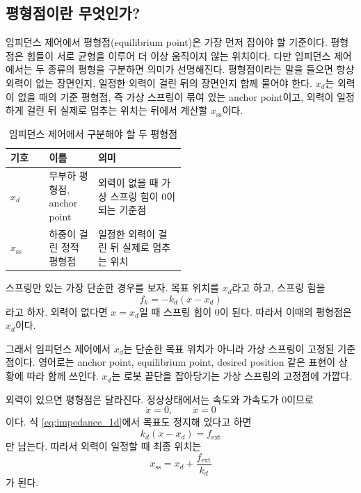 \subsection{평형점이란 무엇인가?}

임피던스 제어에서 평형점(equilibrium point)은 가장 먼저 잡아야 할 기준이다.
평형점은 힘들이 서로 균형을 이루어 더 이상 움직이지 않는 위치이다.
다만 임피던스 제어에서는 두 종류의 평형을 구분하면 의미가 선명해진다.
평형점이라는 말을 들으면 항상 외력이 없는 장면인지, 일정한 외력이 걸린 뒤의 장면인지 함께 물어야 한다.
$x_d$는 외력이 없을 때의 기준 평형점, 즉 가상 스프링이 묶여 있는 anchor point이고, 외력이 일정하게 걸린 뒤 실제로 멈추는 위치는 뒤에서 계산할 $x_{\mathrm{ss}}$이다.

\begin{table}[!htbp]
  \centering
  \caption{임피던스 제어에서 구분해야 할 두 평형점}
  \small
  \begin{tabularx}{\linewidth}{@{}>{\raggedright\arraybackslash}p{0.22\linewidth}>{\raggedright\arraybackslash}p{0.28\linewidth}>{\raggedright\arraybackslash}X@{}}
    \toprule
    기호 & 이름 & 의미 \\
    \midrule
    $x_d$ & 무부하 평형점, anchor point & 외력이 없을 때 가상 스프링 힘이 0이 되는 기준점 \\
    $x_{\mathrm{ss}}$ & 하중이 걸린 정적 평형점 & 일정한 외력이 걸린 뒤 실제로 멈추는 위치 \\
    \bottomrule
  \end{tabularx}
\end{table}

스프링만 있는 가장 단순한 경우를 보자.
목표 위치를 $x_d$라고 하고, 스프링 힘을
\begin{equation}
  f_k=-k_d(x-x_d)
\end{equation}
라고 하자.
외력이 없다면 $x=x_d$일 때 스프링 힘이 0이 된다.
따라서 이때의 평형점은 $x_d$이다.

그래서 임피던스 제어에서 $x_d$는 단순한 목표 위치가 아니라 가상 스프링이 고정된 기준점이다.
영어로는 anchor point, equilibrium point, desired position 같은 표현이 상황에 따라 함께 쓰인다.
$x_d$는 로봇 끝단을 잡아당기는 가상 스프링의 고정점에 가깝다.

외력이 있으면 평형점은 달라진다.
정상상태에서는 속도와 가속도가 0이므로
\begin{equation}
  \dot{x}=0, \qquad \ddot{x}=0
\end{equation}
이다.
식 \eqref{eq:impedance_1d}에서 목표도 정지해 있다고 하면
\begin{equation}
  k_d(x-x_d)=f_{\mathrm{ext}}
\end{equation}
만 남는다.
따라서 외력이 일정할 때 최종 위치는
\begin{equation}
  x_{\mathrm{ss}}
  =
  x_d+\frac{f_{\mathrm{ext}}}{k_d}
  \label{eq:steady_position_under_force}
\end{equation}
가 된다.

